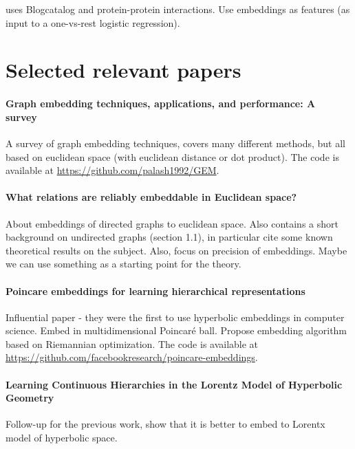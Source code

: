 \documentclass{article}
\begin{document}
\cite{goyal2018graph} uses Blogcatalog and protein-protein interactions. Use embeddings as features (as input to a one-vs-rest logistic regression).

\section{Selected relevant papers}

\paragraph{Graph embedding techniques, applications, and performance: A survey~\cite{goyal2018graph}}

A survey of graph embedding techniques, covers many different methods, but all based on euclidean space (with euclidean distance or dot product). The code is available at \url{https://github.com/palash1992/GEM}.

\paragraph{What relations are reliably embeddable in Euclidean space?~\cite{bhattacharjee2019relations}}

About embeddings of directed graphs to euclidean space. Also contains a short background on undirected graphs (section 1.1), in particular cite some known theoretical results on the subject. Also, focus on precision of embeddings. Maybe we can use something as a starting point for the theory. 

\paragraph{Poincare embeddings for learning hierarchical representations~\cite{nickel2017poincare}}

Influential paper - they were the first to use hyperbolic embeddings in computer science.
Embed in multidimensional Poincar{\'e} ball. Propose embedding algorithm based on Riemannian optimization. The code is available at \url{https://github.com/facebookresearch/poincare-embeddings}.

\paragraph{Learning Continuous Hierarchies in the Lorentz Model of Hyperbolic Geometry~\cite{nickel2018learning}}

Follow-up for the previous work, show that it is better to embed to Lorentx model of hyperbolic space. 
\end{document}
